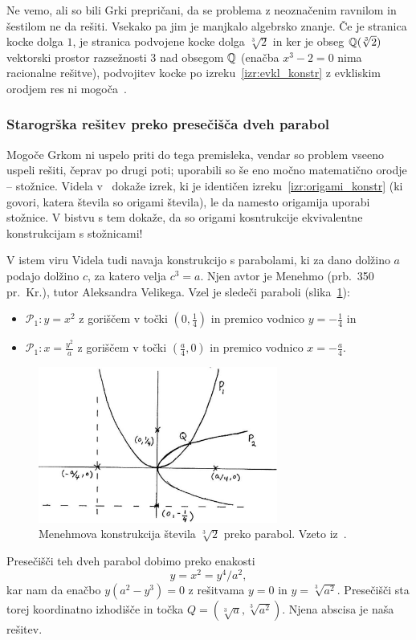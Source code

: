 Ne vemo, ali so bili Grki prepričani, da se problema z neoznačenim ravnilom in šestilom ne da rešiti. Vsekako pa jim je manjkalo algebrsko znanje. Če je stranica kocke dolga $1$, je stranica podvojene kocke dolga $\sqrt[3]{2}$ in ker je obseg $\mathbb Q(\sqrt[3]{2})$ vektorski prostor razsežnosti $3$ nad obsegom $\mathbb Q$ (enačba $ x^3 - 2 = 0 $ nima racionalne rešitve), podvojitev kocke po izreku~\ref{izr:evkl_konstr} z evkliskim orodjem res ni mogoča~\cite[str. 78]{jerman1998}.

\subsubsection*{Starogrška rešitev preko presečišča dveh parabol}

Mogoče Grkom ni uspelo priti do tega premisleka, vendar so problem vseeno uspeli rešiti, čeprav po drugi poti; uporabili so še eno močno matematično orodje -- stožnice. Videla v~\cite{videla1997} dokaže izrek, ki je identičen izreku~\ref{izr:origami_konstr} (ki govori, katera števila so origami števila), le da namesto origamija uporabi stožnice. V bistvu s tem dokaže, da so origami kosntrukcije ekvivalentne konstrukcijam s stožnicami!

V istem viru Videla tudi navaja konstrukcijo s parabolami, ki za dano dolžino $a$ podajo dolžino $c$, za katero velja $c^3 = a$. Njen avtor je Menehmo (prb.\ 350 pr.\ Kr.), tutor Aleksandra Velikega. Vzel je sledeči paraboli (slika~\ref{fig:videla}):
\begin{itemize}
    \item $\mathcal{P}_1: y = x^2$ z goriščem v točki $(0, \frac{1}{4})$ in premico vodnico $y = - \frac{1}{4}$ in
    \item $\mathcal{P}_1: x = \frac{y^2}{a}$ z goriščem v točki $(\frac{a}{4}, 0)$ in premico vodnico $x = - \frac{a}{4}$.
\end{itemize}
\begin{figure}[h]
    \centering
    \includegraphics[width=0.7\textwidth]{images/starogr_problemi/cube_parabola.png}
    \caption[Menehmova konstrukcija kubičnega korena]{Menehmova konstrukcija števila $\sqrt[3]{2}$ preko parabol. Vzeto iz~\cite[str.\ 6]{videla1997}.}
    \label{fig:videla}
\end{figure}
Presečišči teh dveh parabol dobimo preko enakosti
$$y = x^2 = y^4/a^2,$$
kar nam da enačbo $y(a^2-y^3) = 0$ z rešitvama $y=0$ in $y = \sqrt[3]{a^2}$. Presečišči sta torej koordinatno izhodišče in točka $Q = (\sqrt[3]{a}, \sqrt[3]{a^2}) $. Njena abscisa je naša rešitev.

